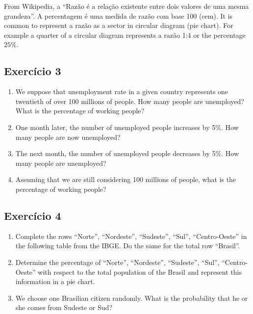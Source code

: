 From Wikipedia, a
``Razão é a relação existente entre dois valores de uma mesma grandeza''.
A percentagem é uma medida de razão com base 100 (cem). It is common to
represent a razão as a sector in circular diagram (pie chart). For example
a quarter of a circular diagram represents a razão 1:4 or the percentage
$25\%$.

\subsection*{Exercício 3}

\begin{enumerate}
\item We suppose that unemployment rate in a given country represents one
  twentieth of over 100 millions of people. How many people are unemployed?
  What is the percentage of working people?
\item One month later, the number of unemployed people increases by 5\%.
  How many people are
  now unemployed?
\item The next month, the number of unemployed people
  decreases by 5\%. How many people are unemployed?
\item Assuming that we are still considering 100 millions of people, what
  is the percentage of working people?
\end{enumerate}

\subsection*{Exercício 4}

\begin{enumerate}
\item Complete the rows ``Norte'', ``Nordeste'', ``Sudeste'', ``Sul'', ``Centro-Oeste'' in the following  table from the IBGE. Do the same for the total row
``Brasil''.
\item Determine the percentage of ``Norte'', ``Nordeste'', ``Sudeste'', ``Sul'', ``Centro-Oeste'' with respect to the total population of the Brasil and
  represent this information in a pie chart.
\item We choose one Brasilian citizen randomly. What is the probability that
  he or she comes from Sudeste or Sud?
\end{enumerate}

